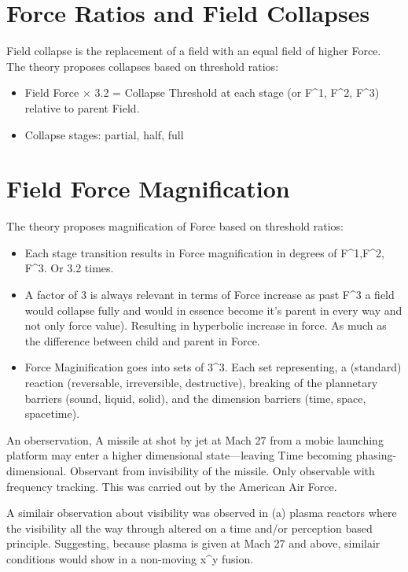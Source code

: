 \documentclass[12pt]{thesis}
\begin{document}
\section{Force Ratios and Field Collapses}
Field collapse is the replacement of a field with an equal field of higher Force.
The theory proposes collapses based on threshold ratios:
\begin{itemize}
    \item Field Force $\times$ 3.2 = Collapse Threshold at each stage (or F^1, F^2, F^3) relative to parent Field.
    \item Collapse stages: partial, half, full
\end{itemize}

\section{Field Force Magnification}
The theory proposes magnification of Force based on threshold ratios:
\begin{itemize}
    \item Each stage transition results in Force magnification in degrees of F^1,F^2, F^3. Or 3.2 times.
    \item A factor of 3 is always relevant in terms of Force increase as past F^3 a field would collapse fully and would in essence become it's parent in every way and not only force value). Resulting in hyperbolic increase in force. As much as the difference between child and parent in Force. 
    \item Force Maginification goes into sets of 3^3. Each set representing, a (standard) reaction (reversable, irreversible, destructive), breaking of the plannetary barriers (sound, liquid, solid), and the dimension barriers (time, space, spacetime).
\end{itemize}

An oberservation, A missile at shot by jet at Mach 27 from a mobie launching platform may enter a higher dimensional state—leaving Time becoming phasing-dimensional.
Observant from invisibility of the missile. Only observable with frequency tracking. This was carried out by the American Air Force.

A similair observation about visibility was observed in (a) plasma reactors where the visibility all the way through altered on a time and/or perception based principle.
Suggesting, because plasma is given at Mach 27 and above, similair conditions would show in a non-moving x^y fusion.
\end{document}
